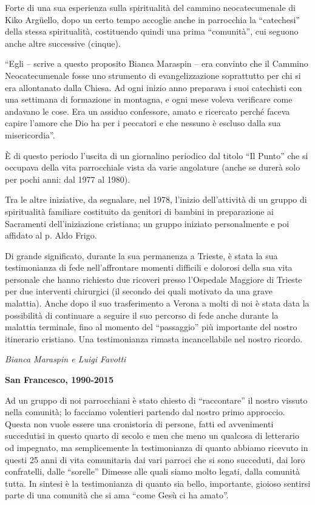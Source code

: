 Forte di una sua esperienza sulla spiritualità del cammino neocatecumenale di Kiko 
Argüello, dopo  un certo tempo accoglie anche in parrocchia la “catechesi” della stessa spiritualità, 
costituendo quindi una prima “comunità”, cui seguono anche altre successive (cinque). 

“Egli – scrive a questo proposito Bianca Maraspin – era convinto che il Cammino 
Neocatecumenale fosse uno strumento di evangelizzazione soprattutto per chi si era allontanato 
dalla Chiesa. Ad ogni inizio anno preparava i suoi catechisti con una settimana di formazione in 
montagna, e ogni mese voleva verificare come andavano le cose. Era un assiduo confessore, amato 
e ricercato perché faceva capire l’amore che Dio ha per i peccatori e che nessuno è escluso dalla sua 
misericordia”.

È di questo periodo l'uscita di un giornalino periodico dal titolo ``Il Punto'' che si occupava della vita parrocchiale
vista da varie angolature (anche se durerà solo per pochi anni: dal 1977 al 1980).

Tra le altre iniziative, da segnalare, nel 1978, l’inizio dell’attività di un gruppo di spiritualità 
familiare costituito da genitori di bambini in preparazione ai Sacramenti dell’iniziazione cristiana; 
un gruppo iniziato personalmente e poi affidato al p. Aldo Frigo. 

Di grande significato, durante la sua permanenza a Trieste, è stata la sua testimonianza di 
fede nell’affrontare momenti difficili e dolorosi della sua vita personale che hanno richiesto due 
ricoveri presso l’Ospedale Maggiore di Trieste per due interventi chirurgici (il secondo dei quali 
motivato da una grave malattia).  Anche dopo il suo trasferimento a Verona  a molti di noi è stata 
data la possibilità di continuare a seguire il suo percorso di fede anche durante la malattia terminale, 
fino al momento del “passaggio” più importante del nostro itinerario cristiano. Una testimonianza  
rimasta incancellabile nel nostro ricordo.
\begin{flushright}
\textit{Bianca Maraspin e Luigi Favotti}
\end{flushright}
\bigskip
{}
{}
\begin{center}
\textbf{\Large San Francesco, 1990-2015}
\end{center}
\bigbreak
\noindent Ad un gruppo di noi parrocchiani è stato chiesto di “raccontare” il nostro vissuto nella
comunità; lo facciamo volentieri partendo dal nostro primo approccio.
Questa non vuole essere una cronistoria di persone, fatti ed avvenimenti succedutisi in questo 
quarto di secolo e men che meno un qualcosa di letterario od impegnato, ma semplicemente  la 
testimonianza di quanto abbiamo ricevuto in questi 25 anni di vita comunitaria dai vari parroci che 
si sono succeduti, dai loro confratelli, dalle “sorelle” Dimesse alle quali siamo molto legati, dalla 
comunità tutta. In sintesi è la testimonianza di quanto sia bello, importante, gioioso sentirsi parte di 
una comunità che si ama “come Gesù ci ha amato”.

